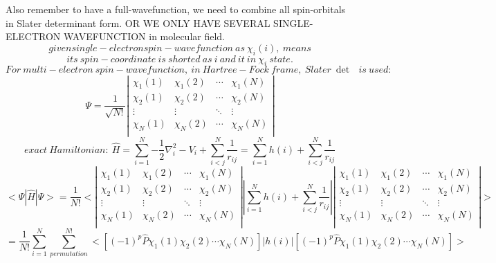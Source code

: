 Also remember to have a full-wavefunction, we need to combine all spin-orbitals in Slater determinant form. OR WE ONLY HAVE SEVERAL SINGLE-ELECTRON WAVEFUNCTION in molecular field.
$$
given single-electron spin-wavefunction\ as\ \chi _i\left( i \right) ,\ means
$$
$$
its\ spin-coordinate\ is\ shorted\ as\ i\ and\ it\ in\ \chi _i\ state.
$$
$$
For\ multi-electron\ spin-wavefunction,\ in\ Hartree-Fock\ frame,\ Slater\ \det\text{\ }is\ used:
$$
$$
\varPsi =\frac{1}{\sqrt{N!}}\left| \begin{matrix}
	\chi _1\left( 1 \right)&		\chi _1\left( 2 \right)&		\cdots&		\chi _1\left( N \right)\\
	\chi _2\left( 1 \right)&		\chi _2\left( 2 \right)&		\cdots&		\chi _2\left( N \right)\\
	\vdots&		\vdots&		\ddots&		\vdots\\
	\chi _N\left( 1 \right)&		\chi _N\left( 2 \right)&		\cdots&		\chi _N\left( N \right)\\
\end{matrix} \right|
$$
$$
exact\ Hamiltonian:\ \hat{H}=\sum_{i=1}^N{-\frac{1}{2}\nabla _{i}^{2}-V_i}+\sum_{i<j}^N{\frac{1}{r_{ij}}}=\sum_{i=1}^N{h\left( i \right)}+\sum_{i<j}^N{\frac{1}{r_{ij}}}
$$
$$
<\varPsi |\hat{H}|\varPsi >=\frac{1}{N!}<\left| \begin{matrix}
	\chi _1\left( 1 \right)&		\chi _1\left( 2 \right)&		\cdots&		\chi _1\left( N \right)\\
	\chi _2\left( 1 \right)&		\chi _2\left( 2 \right)&		\cdots&		\chi _2\left( N \right)\\
	\vdots&		\vdots&		\ddots&		\vdots\\
	\chi _N\left( 1 \right)&		\chi _N\left( 2 \right)&		\cdots&		\chi _N\left( N \right)\\
\end{matrix} \right||\sum_{i=1}^N{h\left( i \right)}+\sum_{i<j}^N{\frac{1}{r_{ij}}}|\left| \begin{matrix}
	\chi _1\left( 1 \right)&		\chi _1\left( 2 \right)&		\cdots&		\chi _1\left( N \right)\\
	\chi _2\left( 1 \right)&		\chi _2\left( 2 \right)&		\cdots&		\chi _2\left( N \right)\\
	\vdots&		\vdots&		\ddots&		\vdots\\
	\chi _N\left( 1 \right)&		\chi _N\left( 2 \right)&		\cdots&		\chi _N\left( N \right)\\
\end{matrix} \right|>
$$
$$
=\frac{1}{N!}\sum_{i=1}^N{\sum_{permutation}^{N!}{<\left[ \left( -1 \right) ^p\hat{P}\chi _1\left( 1 \right) \chi _2\left( 2 \right) \cdots \chi _N\left( N \right) \right] |h\left( i \right) |\left[ \left( -1 \right) ^p\hat{P}\chi _1\left( 1 \right) \chi _2\left( 2 \right) \cdots \chi _N\left( N \right) \right] >}}
$$

